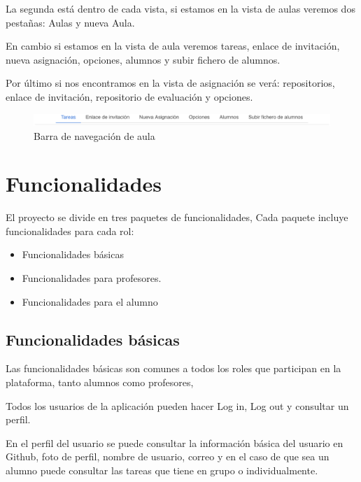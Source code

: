 La segunda está dentro de cada vista, si estamos en la vista de aulas veremos dos pestañas: Aulas y nueva Aula.

En cambio si estamos en la vista de aula veremos tareas, enlace de invitación, nueva asignación, opciones, alumnos y subir fichero de alumnos.

Por último si nos encontramos en la vista de asignación se verá: repositorios, enlace de invitación, repositorio de evaluación y opciones.

\begin{figure}[!th]
\begin{center}
\includegraphics[scale=0.5]{images/navaula}
\caption{Barra de navegación de aula}
\label{fig:Barra de navegacion de aula}
\end{center}
\end{figure}


\section{Funcionalidades}
\label{:sec6}

El proyecto se divide en tres paquetes de funcionalidades, Cada paquete incluye funcionalidades para cada rol:

\begin{itemize}
  \item Funcionalidades básicas
  \item Funcionalidades para profesores.
  \item Funcionalidades para el alumno
\end{itemize}

\subsection{Funcionalidades básicas}
\label{3:6:1}

Las funcionalidades básicas son comunes a todos los roles que participan en la plataforma, tanto alumnos como profesores, 

Todos los usuarios de la aplicación pueden hacer Log in, Log out y consultar un perfil.

En el perfil del usuario se puede consultar la información básica del usuario en Github, foto de perfil, nombre de usuario, correo y en el caso de que sea un alumno puede consultar las tareas que tiene en grupo o individualmente.

